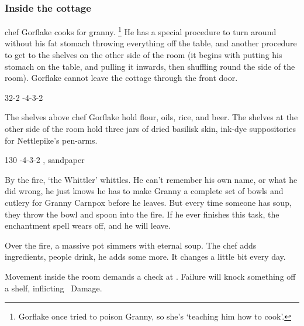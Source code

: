 \documentclass[10pt,twoside]{book}
\begin{document}
\subsubsection{Inside the cottage}
chef Gorflake cooks for granny.%
\footnote{Gorflake once tried to poison Granny, so she's `teaching him how to cook'.}
He has a special procedure to turn around without his fat stomach throwing everything off the table, and another procedure to get to the shelves on the other side of the room (it begins with putting his stomach on the table, and pulling it inwards, then shuffling round the side of the room).
Gorflake cannot leave the cottage through the front door.

%
  {{3}{2}{-2}}%
  {{-4}{-3}{-2}}%
  {%
  }%
  {}%
  {}%
  {}%

The shelves above chef Gorflake hold flour, oils, rice, and beer.
The shelves at the other side of the room hold three jars of dried \gls{basilisk} skin, ink-dye suppositories for Nettlepike's pen-arms.

%
  {{1}{3}{0}}%
  {{-4}{-3}{-2}}%
  {%
    \Dagger
  }%
  {, \weaponmaster}%
  {sandpaper}%
  {}%

By the fire, `the Whittler' whittles.%
He can't remember his own name, or what he did wrong, he just knows he has to make Granny a complete set of bowls and cutlery for Granny Carnpox before he leaves.
But every time someone has soup, they throw the bowl and spoon into the fire.
If he ever finishes this task, the enchantment \gls{spell} wears off, and he will leave.

Over the fire, a massive pot simmers with eternal soup.
The chef adds ingredients, people drink, he adds some more.
It changes a little bit every day.

Movement inside the room demands a  check at \tn[8].
Failure will knock something off a shelf, inflicting ~Damage.
\end{document}
